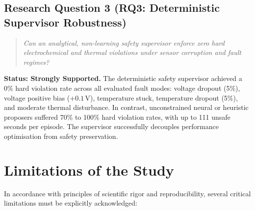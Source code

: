 \subsection*{Research Question 3 (RQ3: Deterministic Supervisor Robustness)}
\begin{quote}
  \emph{Can an analytical, non-learning safety supervisor enforce zero hard
  electrochemical and thermal violations under sensor corruption and fault regimes?}
\end{quote}
\textbf{Status: Strongly Supported.}
The deterministic safety supervisor achieved a 0\% hard violation rate across
all evaluated fault modes: voltage dropout (5\%), voltage positive bias
($+0.1\,\mathrm{V}$), temperature stuck, temperature dropout (5\%), and
moderate thermal disturbance. In contrast, unconstrained neural or heuristic
proposers suffered 70\% to 100\% hard violation rates, with up to 111 unsafe
seconds per episode. The supervisor successfully decouples performance
optimisation from safety preservation.

\section{Limitations of the Study}

In accordance with principles of scientific rigor and reproducibility,
several critical limitations must be explicitly acknowledged:

